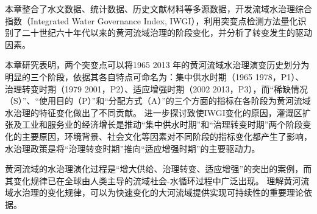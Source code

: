 本章整合了水文数据、统计数据、历史文献材料等多源数据，开发流域水治理综合指数（Integrated Water Governance Index, IWGI），利用突变点检测方法量化识别了二十世纪六十年代以来的黄河流域治理的阶段变化，并分析了转变发生的驱动因素。

本章研究表明，两个突变点可以将1965 \textendash{} 2013 年的黄河流域水治理演变历史划分为明显的三个阶段，依据其各自特点可命名为：集中供水时期（1965 \textendash{} 1978，P1）、治理转变时期（1979 \textendash{} 2001，P2）、适应增强时期（2002 \textendash{} 2013，P3），而“稀缺情况（S）”、“使用目的（P）”和“分配方式（A）”的三个方面的指标在各阶段为黄河流域水治理的特征变化做出了不同贡献。
进一步探讨致使IWGI变化的原因，灌溉区扩张及工业和服务业的经济增长是推动“集中供水时期”和“治理转变时期”两个阶段变化的主要原因，环境背景、社会文化等因素对不同阶段的指标变化都产生了影响，水治理政策是将“治理转变时期”推向“适应增强时期”的主要驱动力。

黄河流域的水治理演化过程是“增大供给、治理转变、适应增强”的突出的案例，而其变化规律已在全球由人类主导的流域社会-水循环过程中广泛出现。
理解黄河流域水治理的变化规律，可以为快速变化的大河流域提供实现可持续性的重要理论依据。
